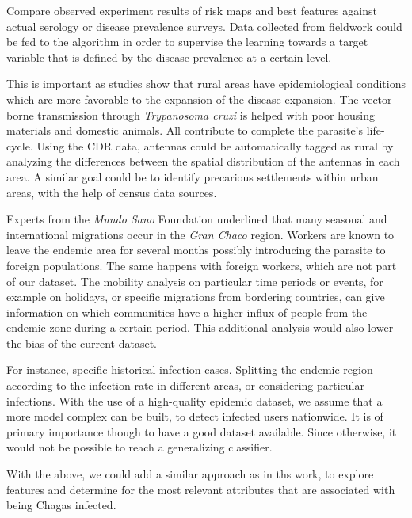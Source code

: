 \begin{description}
    \item [Results validation.] Compare observed experiment results of risk maps and best features against actual serology or disease prevalence surveys.
    Data collected from fieldwork could be fed to the algorithm in order to supervise the learning towards a target variable that is defined by the disease prevalence at a certain level.


    \item [Differentiating rural antennas from urban ones.] This is important as studies show that rural areas have epidemiological conditions which are more favorable to the expansion of the disease expansion.
    The vector-borne transmission through \textit{Trypanosoma cruzi} is helped with poor housing materials and domestic animals.
    All  contribute to complete the parasite's life-cycle.
    Using the CDR data, antennas could be automatically tagged as rural by analyzing the differences between the spatial distribution of the antennas in each area.
    A similar goal could be to identify precarious settlements within urban areas, with the help of census data sources.

    \item [International and seasonal migration analysis.] Experts from the \textit{Mundo Sano} Foundation underlined that many seasonal and international migrations occur in the \textit{Gran Chaco} region.
    Workers are known to leave the endemic area for several months possibly introducing the parasite to foreign populations.
    The same happens with foreign workers, which are not part of our dataset.
    The mobility analysis on particular time periods or events, for example on holidays, or specific migrations from bordering countries, can give information on which communities have a higher influx of people from the endemic zone during a certain period.
    This additional analysis would also lower the bias of the current dataset.


    \item [Search for epidemiological data at a detailed level.] For instance, specific historical infection cases.
    Splitting the endemic region according to the infection rate in different areas, or considering particular infections.
    With the use of a high-quality epidemic dataset, we assume that a more model complex can be built, to detect infected users nationwide.
    It is of primary importance though to have a good dataset available.
    Since otherwise, it would not be possible to reach a generalizing classifier.

    \item With the above, we could add a similar approach as in ths work, to explore features and determine for the most relevant attributes that are associated with being Chagas infected.

\end{description}




